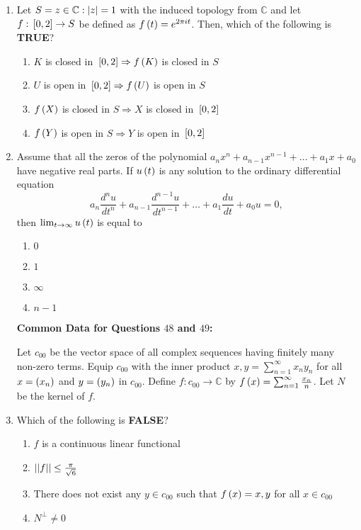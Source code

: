 \documentclass[journal,12pt,twocolumn]{IEEEtran}
\theoremstyle{remark}
\begin{document}
\begin{enumerate}[start=40]
    \item Let $S = {z \in \mathbb{C} : \left\vert z\right\vert = 1}$ with the induced topology from $\mathbb{C}$ and let $f: {}\left[0, 2\right] \rightarrow S$ be defined as $f \left(t\right) = e^{2 \pi i t}$. Then, which of the following is \textbf{TRUE}?
    \begin{enumerate}
        \item $K$ is closed in ${}\left[0, 2\right] \Rightarrow f \left(K\right)$ is closed in $S$
        \item $U$ is open in ${}\left[0, 2\right] \Rightarrow f \left(U\right)$ is open in $S$
        \item $f \left(X\right)$ is closed in $S \Rightarrow X$ is closed in ${}\left[0, 2\right]$
        \item $f \left(Y\right)$ is open in $S \Rightarrow Y$ is open in ${}\left[0, 2\right]$
    \end{enumerate}

    \item Assume that all the zeros of the polynomial $a_n x^n + a_{n-1} x^{n-1} + \dots + a_1 x + a_0$ have negative real parts. If $u \left(t\right)$ is any solution to the ordinary differential equation
    \[
    a_n \frac{d^n u}{d t^n} + a_{n-1} \frac{d^{n-1} u}{d t^{n-1}} + \dots + a_1 \frac{d u}{d t} + a_0 u = 0,
    \]
    then $\lim_{t \to \infty} u \left(t\right)$ is equal to
    \begin{enumerate}
        \item $0$
        \item $1$
        \item $\infty$
        \item $n - 1$
    \end{enumerate}

\textbf{Common Data for Questions $48$ and $49$:}

    Let $c_{00}$ be the vector space of all complex sequences having finitely many non-zero terms. Equip $c_{00}$ with the inner product ${x, y} = \sum_{n = 1}^{\infty} x_n y_n$ for all $x = \left(x_n\right)$ and $y = \left(y_n\right)$ in $c_{00}$. Define $f: c_{00} \rightarrow \mathbb{C}$ by $f \left(x\right) = \sum_{n=1}^{\infty} \frac{x_n}{n}$. Let $N$ be the kernel of $f$.

    \item Which of the following is \textbf{FALSE}?
    \begin{enumerate}
        \item $f$ is a continuous linear functional
        \item $\left\vert\left\vert f\right\vert\right\vert \leq \frac{\pi}{\sqrt{6}}$
        \item There does not exist any $y \in c_{00}$ such that $f \left(x\right) = {x, y}$ for all $x \in c_{00}$
        \item $N^{\perp} \neq {0}$
    \end{enumerate}


\end{enumerate}
\end{document}
